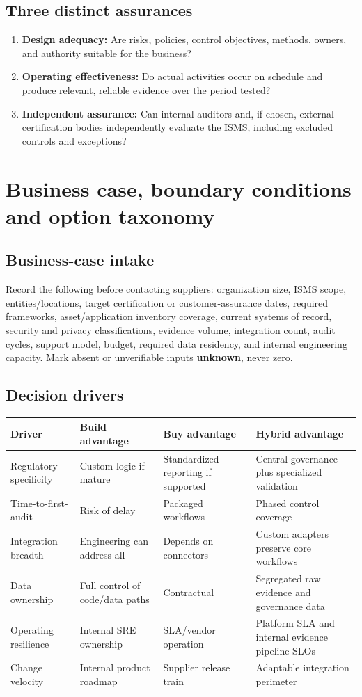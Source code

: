 \documentclass[10pt,letterpaper]{article}
\begin{document}
\subsection{Three distinct assurances}
\begin{enumerate}
\item \textbf{Design adequacy:} Are risks, policies, control objectives, methods, owners, and authority suitable for the business?
\item \textbf{Operating effectiveness:} Do actual activities occur on schedule and produce relevant, reliable evidence over the period tested?
\item \textbf{Independent assurance:} Can internal auditors and, if chosen, external certification bodies independently evaluate the ISMS, including excluded controls and exceptions?
\end{enumerate}

\section{Business case, boundary conditions and option taxonomy}
\subsection{Business-case intake}
Record the following before contacting suppliers: organization size, ISMS scope, entities/locations, target certification or customer-assurance dates, required frameworks, asset/application inventory coverage, current systems of record, security and privacy classifications, evidence volume, integration count, audit cycles, support model, budget, required data residency, and internal engineering capacity. Mark absent or unverifiable inputs \textbf{unknown}, never zero.

\subsection{Decision drivers}

\begin{tabularx}{\linewidth}{@{}L{1.28in}YYY@{}}
\toprule
\textbf{Driver} & \textbf{Build advantage} & \textbf{Buy advantage} & \textbf{Hybrid advantage}\\\midrule
Regulatory specificity & Custom logic if mature & Standardized reporting if supported & Central governance plus specialized validation\\
Time-to-first-audit & Risk of delay & Packaged workflows & Phased control coverage\\
Integration breadth & Engineering can address all & Depends on connectors & Custom adapters preserve core workflows\\
Data ownership & Full control of code/data paths & Contractual & Segregated raw evidence and governance data\\
Operating resilience & Internal SRE ownership & SLA/vendor operation & Platform SLA and internal evidence pipeline SLOs\\
Change velocity & Internal product roadmap & Supplier release train & Adaptable integration perimeter\\
\bottomrule
\end{tabularx}
\end{document}
